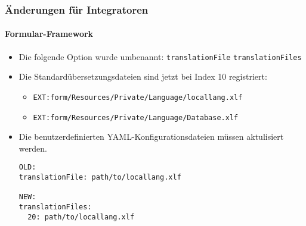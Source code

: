 \begin{frame}[fragile]
	\frametitle{Änderungen für Integratoren}
	\framesubtitle{Formular-Framework}

	\lstset{basicstyle=\tiny\ttfamily}

	\begin{itemize}
		\item Die folgende Option wurde umbenannt:\newline
			\small\texttt{translationFile} \textrightarrow\hspace{0.1cm}\texttt{translationFiles}\normalsize
		\item Die Standardübersetzungsdateien sind jetzt bei Index 10 registriert:

			\begin{itemize}
				\item \texttt{EXT:form/Resources/Private/Language/locallang.xlf}
				\item \texttt{EXT:form/Resources/Private/Language/Database.xlf}
			\end{itemize}

		\item Die benutzerdefinierten YAML-Konfigurationsdateien müssen aktulisiert werden.

\begin{lstlisting}
OLD:
translationFile: path/to/locallang.xlf

NEW:
translationFiles:
  20: path/to/locallang.xlf
\end{lstlisting}

	\end{itemize}

\end{frame}


